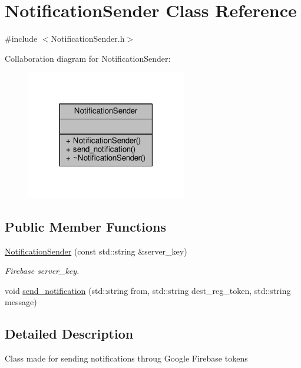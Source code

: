 \hypertarget{classNotificationSender}{}\section{Notification\+Sender Class Reference}
\label{classNotificationSender}


{\ttfamily \#include $<$Notification\+Sender.\+h$>$}



Collaboration diagram for Notification\+Sender\+:\nopagebreak
\begin{figure}[H]
\begin{center}
\leavevmode
\includegraphics[width=198pt]{d5/d07/classNotificationSender__coll__graph}
\end{center}
\end{figure}
\subsection*{Public Member Functions}
\begin{DoxyCompactItemize}
\item 
\hyperlink{classNotificationSender_a66f6e3ebf175d8d894f2dd61f8184732}{Notification\+Sender} (const std\+::string \&server\+\_\+key)\hypertarget{classNotificationSender_a66f6e3ebf175d8d894f2dd61f8184732}{}\label{classNotificationSender_a66f6e3ebf175d8d894f2dd61f8184732}

\begin{DoxyCompactList}\small\item\em Firebase server\+\_\+key. \end{DoxyCompactList}\item 
void \hyperlink{classNotificationSender_a0c066b5231c6110b8118d98de43eacac}{send\+\_\+notification} (std\+::string from, std\+::string dest\+\_\+reg\+\_\+token, std\+::string message)
\end{DoxyCompactItemize}


\subsection{Detailed Description}
Class made for sending notifications throug Google Firebase tokens 

